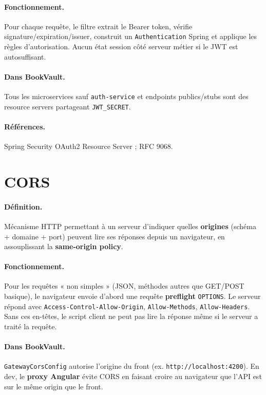 \documentclass[12pt,a4paper]{report}
\begin{document}
\paragraph{Fonctionnement.} Pour chaque requête, le filtre extrait le Bearer token, vérifie signature/expiration/issuer, construit un \texttt{Authentication} Spring et applique les règles d'autorisation. Aucun état session côté serveur métier si le JWT est autosuffisant.\par

\paragraph{Dans BookVault.} Tous les microservices sauf \texttt{auth-service} et endpoints publics/stubs sont des resource servers partageant \texttt{JWT\_SECRET}.\par

\paragraph{Références.} Spring Security OAuth2 Resource Server ; RFC 9068.\par


\section{CORS}

\paragraph{Définition.} Mécanisme HTTP permettant à un serveur d'indiquer quelles \textbf{origines} (schéma + domaine + port) peuvent lire ses réponses depuis un navigateur, en assouplissant la \textbf{same-origin policy}.\par

\paragraph{Fonctionnement.} Pour les requêtes « non simples » (JSON, méthodes autres que GET/POST basique), le navigateur envoie d'abord une requête \textbf{preflight} \texttt{OPTIONS}. Le serveur répond avec \texttt{Access-Control-Allow-Origin}, \texttt{Allow-Methods}, \texttt{Allow-Headers}. Sans ces en-têtes, le script client ne peut pas lire la réponse même si le serveur a traité la requête.\par

\paragraph{Dans BookVault.} \texttt{GatewayCorsConfig} autorise l'origine du front (ex. \texttt{http://localhost:4200}). En dev, le \textbf{proxy Angular} évite CORS en faisant croire au navigateur que l'API est sur le même origin que le front.\par
\end{document}
